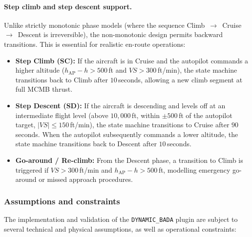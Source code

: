 \paragraph{Step climb and step descent support.}
Unlike strictly monotonic phase models (where the sequence Climb~$\rightarrow$~Cruise~$\rightarrow$~Descent is irreversible), the non-monotonic design permits backward transitions. This is essential for realistic en-route operations:

\begin{itemize}
    \item \textbf{Step Climb (SC):} If the aircraft is in Cruise and the autopilot commands a higher altitude ($h_{\text{AP}} - h > 500$\,ft and $VS > 300$\,ft/min), the state machine transitions back to Climb after $10$\,seconds, allowing a new climb segment at full MCMB thrust.

    \item \textbf{Step Descent (SD):} If the aircraft is descending and levels off at an intermediate flight level (above $10{,}000$\,ft, within $\pm 500$\,ft of the autopilot target, $|VS| \leq 150$\,ft/min), the state machine transitions to Cruise after $90$\,seconds. When the autopilot subsequently commands a lower altitude, the state machine transitions back to Descent after $10$\,seconds.

    \item \textbf{Go-around / Re-climb:} From the Descent phase, a transition to Climb is triggered if $VS > 300$\,ft/min and $h_{\text{AP}} - h > 500$\,ft, modelling emergency go-around or missed approach procedures.
\end{itemize}

\subsubsection{Assumptions and constraints}
The implementation and validation of the \texttt{DYNAMIC\_BADA} plugin are subject to several technical and physical assumptions, as well as operational constraints:

